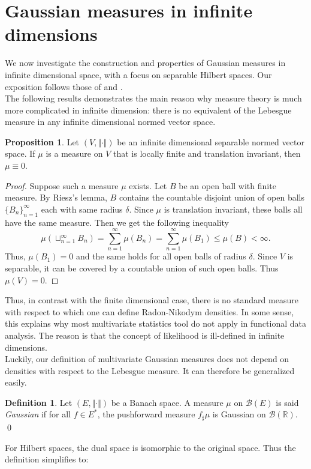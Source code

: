 \documentclass[10pt, a4paper]{report}
\newcommand{\R}[0]{\mathbb{R}}
\theoremstyle{definition}
\newtheorem{prop}{Proposition}
\newtheorem{definition}{Definition}
\theoremstyle{remark}
\begin{document}
\section{Gaussian measures in infinite dimensions}
We now investigate the construction and properties of Gaussian measures in infinite dimensional space, with a focus on separable Hilbert spaces. Our exposition follows those of \cite{prato1} and \cite{prato2}.\\
The following results demonstrates the main reason why measure theory is much more complicated in infinite dimension: there is no equivalent of the Lebesgue measure in any infinite dimensional normed vector space.
\begin{prop}\label{noleb}
	Let $(V,\Vert \cdot \Vert)$ be an infinite dimensional separable normed vector space. If $\mu$ is a measure on $V$ that is locally finite and translation invariant, then $\mu \equiv 0$. 
	\begin{proof}
		Suppose such a measure $\mu$ exists. Let $B$ be an open ball with finite measure. By Riesz's lemma, $B$ contains the countable disjoint union of open balls $\{B_n\}_{n=1}^\infty$ each with same radius $\delta$. Since $\mu$ is translation invariant, these balls all have the same measure. Then we get the following inequality
		$$\mu\left(\sqcup_{n=1}^\infty B_n\right) = \sum_{n=1}^{\infty}\mu(B_n) = \sum_{n=1}^{\infty}\mu(B_1) \leq \mu(B) < \infty.$$
		Thus, $\mu(B_1)=0$ and the same holds for all open balls of radius $\delta$. Since $V$ is separable, it can be covered by a countable union of such open balls. Thus $\mu(V)=0$.
	\end{proof}
\end{prop}
Thus, in contrast with the finite dimensional case, there is no standard measure with respect to which one can define Radon-Nikodym densities. In some sense, this explains why most multivariate statistics tool do not apply in functional data analysis. The reason is that the concept of likelihood is ill-defined in infinite dimensions.\\
Luckily, our definition of multivariate Gaussian measures does not depend on densities with respect to the Lebesgue measure. It can therefore be generalized easily.
\begin{definition}
	Let $(E,\Vert \cdot \Vert)$ be a Banach space. A measure $\mu$ on $\mathcal{B}(E)$ is said \emph{Gaussian} if for all $f \in E^*$, the pushforward measure $f_\sharp \mu$ is Gaussian on $\mathcal{B}(\R)$. \qed
\end{definition}
For Hilbert spaces, the dual space is isomorphic to the original space. Thus the definition simplifies to:
\end{document}
